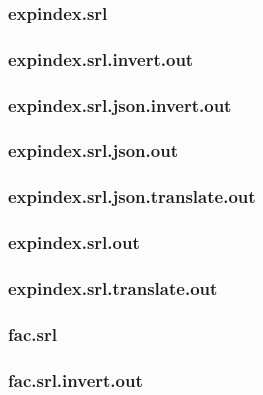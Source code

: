\subsubsection{expindex.srl}
\label{app:expindex_srl}

\subsubsection{expindex.srl.invert.out}
\label{app:expindex_srl.invert.out}

\subsubsection{expindex.srl.json.invert.out}
\label{app:expindex_srl.json.invert.out}

\subsubsection{expindex.srl.json.out}
\label{app:expindex_srl.json.out}

\subsubsection{expindex.srl.json.translate.out}
\label{app:expindex_srl.json.translate.out}

\subsubsection{expindex.srl.out}
\label{app:expindex_srl.out}

\subsubsection{expindex.srl.translate.out}
\label{app:expindex_srl.translate.out}

\subsubsection{fac.srl}
\label{app:fac_srl}

\subsubsection{fac.srl.invert.out}
\label{app:fac_srl.invert.out}

